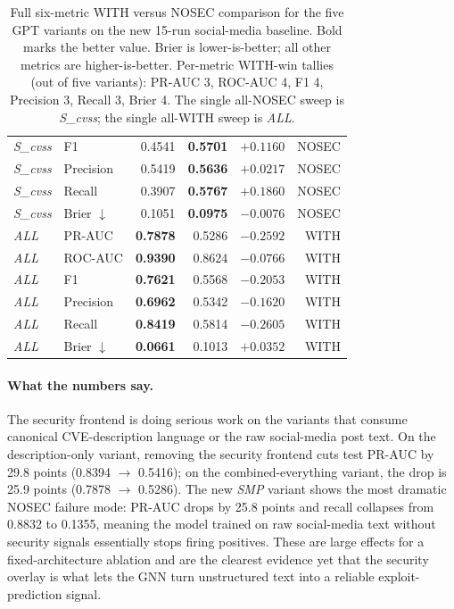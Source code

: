 \documentclass[11pt,a4paper]{article}
\begin{document}
\begin{table}[!htbp]
\begin{tabular}{l l rr r r}
\emph{S\_cvss} & F1        & 0.4541 & \textbf{0.5701} & $+0.1160$ & NOSEC \\
\emph{S\_cvss} & Precision & 0.5419 & \textbf{0.5636} & $+0.0217$ & NOSEC \\
\emph{S\_cvss} & Recall    & 0.3907 & \textbf{0.5767} & $+0.1860$ & NOSEC \\
\emph{S\_cvss} & Brier $\downarrow$ & 0.1051 & \textbf{0.0975} & $-0.0076$ & NOSEC \\
\midrule
\emph{ALL} & PR-AUC    & \textbf{0.7878} & 0.5286 & $-0.2592$ & WITH  \\
\emph{ALL} & ROC-AUC   & \textbf{0.9390} & 0.8624 & $-0.0766$ & WITH  \\
\emph{ALL} & F1        & \textbf{0.7621} & 0.5568 & $-0.2053$ & WITH  \\
\emph{ALL} & Precision & \textbf{0.6962} & 0.5342 & $-0.1620$ & WITH  \\
\emph{ALL} & Recall    & \textbf{0.8419} & 0.5814 & $-0.2605$ & WITH  \\
\emph{ALL} & Brier $\downarrow$ & \textbf{0.0661} & 0.1013 & $+0.0352$ & WITH  \\
\bottomrule
\end{tabular}
\caption{Full six-metric WITH versus NOSEC comparison for
the five GPT variants on the new 15-run social-media
baseline. Bold marks the better value. Brier is
lower-is-better; all other metrics are higher-is-better.
Per-metric WITH-win tallies (out of five variants): PR-AUC
3, ROC-AUC 4, F1 4, Precision 3, Recall 3, Brier 4. The
single all-NOSEC sweep is \emph{S\_cvss}; the single
all-WITH sweep is \emph{ALL}.}
\label{tab:gpt-full}
\end{table}

\paragraph{What the numbers say.}
The security frontend is doing serious work on the
variants that consume canonical CVE-description language
or the raw social-media post text. On the
description-only variant, removing the security frontend
cuts test PR-AUC by 29.8 points (0.8394 $\to$ 0.5416);
on the combined-everything variant, the drop is 25.9
points (0.7878 $\to$ 0.5286). The new \emph{SMP} variant
shows the most dramatic NOSEC failure mode: PR-AUC drops
by 25.8 points and recall collapses from 0.8832 to
0.1355, meaning the model trained on raw social-media
text without security signals essentially stops firing
positives. These are large effects for a fixed-architecture
ablation and are the clearest evidence yet that the
security overlay is what lets the GNN turn unstructured
text into a reliable exploit-prediction signal.
\end{document}
